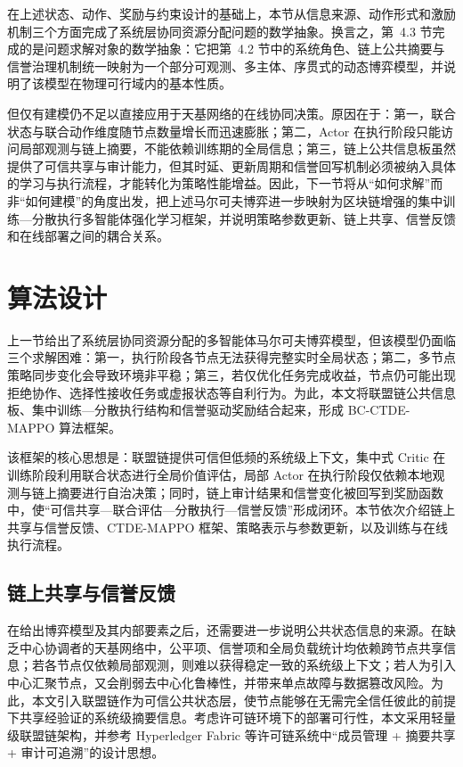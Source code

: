 在上述状态、动作、奖励与约束设计的基础上，本节从信息来源、动作形式和激励机制三个方面完成了系统层协同资源分配问题的数学抽象。换言之，第~4.3 节完成的是问题求解对象的数学抽象：它把第~4.2 节中的系统角色、链上公共摘要与信誉治理机制统一映射为一个部分可观测、多主体、序贯式的动态博弈模型，并说明了该模型在物理可行域内的基本性质。

但仅有建模仍不足以直接应用于天基网络的在线协同决策。原因在于：第一，联合状态与联合动作维度随节点数量增长而迅速膨胀；第二，Actor 在执行阶段只能访问局部观测与链上摘要，不能依赖训练期的全局信息；第三，链上公共信息板虽然提供了可信共享与审计能力，但其时延、更新周期和信誉回写机制必须被纳入具体的学习与执行流程，才能转化为策略性能增益。因此，下一节将从“如何求解”而非“如何建模”的角度出发，把上述马尔可夫博弈进一步映射为区块链增强的集中训练—分散执行多智能体强化学习框架，并说明策略参数更新、链上共享、信誉反馈和在线部署之间的耦合关系。


\section{算法设计}

上一节给出了系统层协同资源分配的多智能体马尔可夫博弈模型，但该模型仍面临三个求解困难：第一，执行阶段各节点无法获得完整实时全局状态；第二，多节点策略同步变化会导致环境非平稳；第三，若仅优化任务完成收益，节点仍可能出现拒绝协作、选择性接收任务或虚报状态等自利行为。为此，本文将联盟链公共信息板、集中训练—分散执行结构和信誉驱动奖励结合起来，形成 BC-CTDE-MAPPO 算法框架。

该框架的核心思想是：联盟链提供可信但低频的系统级上下文，集中式 Critic 在训练阶段利用联合状态进行全局价值评估，局部 Actor 在执行阶段仅依赖本地观测与链上摘要进行自治决策；同时，链上审计结果和信誉变化被回写到奖励函数中，使“可信共享—联合评估—分散执行—信誉反馈”形成闭环。本节依次介绍链上共享与信誉反馈、CTDE-MAPPO 框架、策略表示与参数更新，以及训练与在线执行流程。

\subsection{链上共享与信誉反馈}

在给出博弈模型及其内部要素之后，还需要进一步说明公共状态信息的来源。在缺乏中心协调者的天基网络中，公平项、信誉项和全局负载统计均依赖跨节点共享信息；若各节点仅依赖局部观测，则难以获得稳定一致的系统级上下文；若人为引入中心汇聚节点，又会削弱去中心化鲁棒性，并带来单点故障与数据篡改风险。为此，本文引入联盟链作为可信公共状态层，使节点能够在无需完全信任彼此的前提下共享经验证的系统级摘要信息。考虑许可链环境下的部署可行性，本文采用轻量级联盟链架构，并参考 Hyperledger Fabric 等许可链系统中“成员管理 + 摘要共享 + 审计可追溯”的设计思想\cite{Androulaki2018Fabric}。

